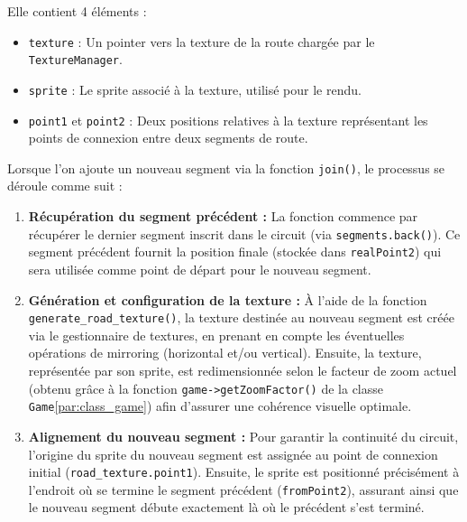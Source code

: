 Elle contient 4 éléments :
\begin{itemize}
    \item \texttt{texture} : Un \gls{pointer} vers la texture de la route chargée par le \texttt{TextureManager}.
    \item \texttt{\gls{sprite}} : Le \gls{sprite} associé à la texture, utilisé pour le rendu.
    \item \texttt{point1} et \texttt{point2} : Deux positions relatives à la texture représentant les points de connexion entre deux segments de route.
\end{itemize}

Lorsque l'on ajoute un nouveau segment via la fonction \texttt{join()}, le processus se déroule comme suit :

\begin{enumerate}
    \item \textbf{Récupération du segment précédent :} %
    La fonction commence par récupérer le dernier segment inscrit dans le circuit (via \texttt{segments.back()}).
    Ce segment précédent fournit la position finale (stockée dans \texttt{realPoint2}) qui sera utilisée comme point de départ pour le nouveau segment.

    \item \textbf{Génération et configuration de la texture :}
    À l'aide de la fonction \texttt{generate\_road\_texture()}, la texture destinée au nouveau segment est créée via le gestionnaire de textures, en prenant en compte les éventuelles opérations de mirroring (horizontal et/ou vertical).
    Ensuite, la texture, représentée par son \gls{sprite}, est redimensionnée selon le facteur de zoom actuel (obtenu grâce à la fonction \texttt{game->getZoomFactor()} de la classe \texttt{Game}\ref{par:class_game}) afin d'assurer une cohérence visuelle optimale.

    \item \textbf{Alignement du nouveau segment :}
    Pour garantir la continuité du circuit, l'origine du \gls{sprite} du nouveau segment est assignée au point de connexion initial (\texttt{road\_texture.point1}).
    Ensuite, le \gls{sprite} est positionné précisément à l'endroit où se termine le segment précédent (\texttt{fromPoint2}), assurant ainsi que le nouveau segment débute exactement là où le précédent s'est terminé.


\end{enumerate}
